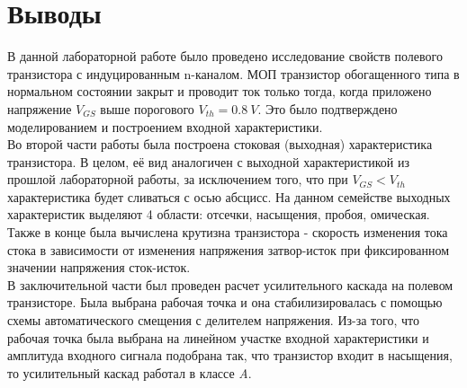 \documentclass[12pt]{article}
\begin{document}
\section*{Выводы}
В данной лабораторной работе было проведено исследование свойств полевого транзистора с индуцированным n-каналом. МОП транзистор обогащенного типа в нормальном состоянии закрыт и проводит ток только тогда, когда приложено напряжение $V_{GS}$ выше порогового $V_{th} = 0.8 \ V$. Это было подтверждено моделированием и построением входной характеристики. \\ 
Во второй части работы была построена стоковая (выходная) характеристика транзистора. В целом, её вид аналогичен с выходной характеристикой из прошлой лабораторной работы, за исключением того, что при $V_{GS}<V_{th}$ характеристика будет сливаться с осью абсцисс. На данном семействе выходных характеристик выделяют 4 области: отсечки, насыщения, пробоя, омическая. Также в конце была вычислена крутизна транзистора - скорость изменения тока стока в зависимости от изменения напряжения затвор-исток при фиксированном значении  напряжения сток-исток.
\\
В заключительной части был проведен расчет усилительного каскада на полевом транзисторе. Была выбрана рабочая точка и она стабилизировалась с помощью схемы автоматического смещения с делителем напряжения. Из-за того, что рабочая точка была выбрана на линейном участке входной характеристики и амплитуда входного сигнала подобрана так, что транзистор входит в насыщения, то усилительный каскад работал в классе \emph{A}.
\end{document}
